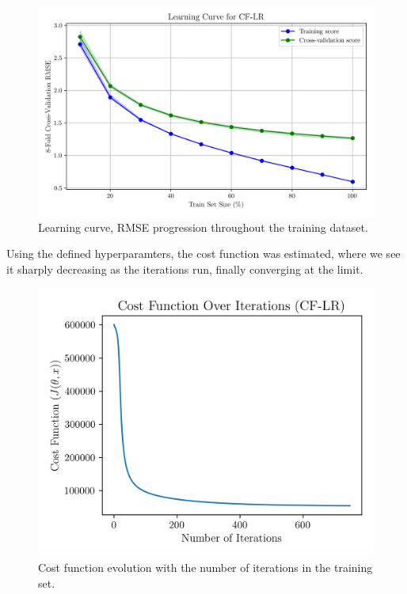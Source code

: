 \documentclass[conference]{IEEEtran}
\begin{document}
\begin{figure}[H]
    \centering
    \includegraphics[width=1\linewidth]{assets/model01_learning_curve.png}
    \caption{Learning curve, RMSE progression throughout the training dataset.}
    \label{fig:model01_learning_curve}
\end{figure}

Using the defined hyperparamters, the cost function was estimated, where we see it sharply decreasing as the iterations run, finally converging at the limit.

\begin{figure}[H]
    \centering
    \includegraphics[width=1\linewidth]{assets/model01_cost_function.png}
    \caption{Cost function evolution with the number of iterations in the training set.}
    \label{fig:model01_cost_function}
\end{figure}
\end{document}
